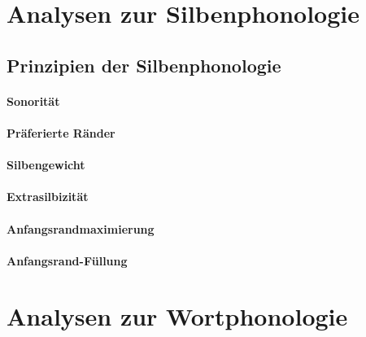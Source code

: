 \section{Analysen zur Silbenphonologie}
\label{sec:phonologie:analysenzursilbenphonologie}

\subsection{Prinzipien der Silbenphonologie}

\paragraph*{Sonorität}

\paragraph*{Präferierte Ränder}

\paragraph*{Silbengewicht}

\paragraph*{Extrasilbizität}

\paragraph*{Anfangsrandmaximierung}

\paragraph*{Anfangsrand-Füllung}



\section{Analysen zur Wortphonologie}
\label{sec:phonologie:analysenzurwortphonologie}




